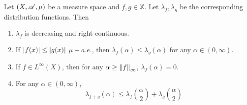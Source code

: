\begin{prop}
	Let $(X,\mathscr{A},\mu)$ be a measure space and $f,g \in \mathbb{X}$. Let $\lambda_f,\lambda_g$ be the corresponding distribution functions. Then
	\begin{enumerate}[label=(\arabic{*})]
		\item $\lambda_f$ is decreasing and right-continuous.
		\item If $\left\lvert f(x)\right\lvert \leq \left\lvert g(x)\right\lvert$ $\mu-a.e.$, then $\lambda_f(\alpha) \leq \lambda_g(\alpha)$ for any $\alpha \in (0,\infty)$.
		\item If $f \in L^\infty(X)$, then for any $\alpha \geq \left\lVert f\right\lVert_{\infty}$, $\lambda_f(\alpha) = 0$.
		\item For any $\alpha \in (0,\infty)$,
		\begin{equation*}
			\lambda_{f+g}(\alpha) \leq \lambda_f\left(\frac{\alpha}{2}\right)+\lambda_g\left(\frac{\alpha}{2}\right)
		\end{equation*}
	\end{enumerate}
\end{prop}
